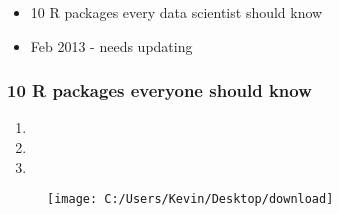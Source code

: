 \documentclass{beamer}
\begin{document}
\begin{frame}
	
	\begin{itemize}
		
		\item 10 R packages every data scientist should know
		
		\item Feb 2013 - needs updating
		
	\end{itemize}
	
\end{frame}

\begin{frame}
\frametitle{10 R packages everyone should know}

\begin{enumerate}
\item

\item

\item
\end{enumerate}
\end{frame}
\begin{frame}
	\begin{figure}
\centering
\texttt{[image: C:/Users/Kevin/Desktop/download]}
\caption{}
\label{fig:download}
\end{figure}

\end{frame}
\end{document}
